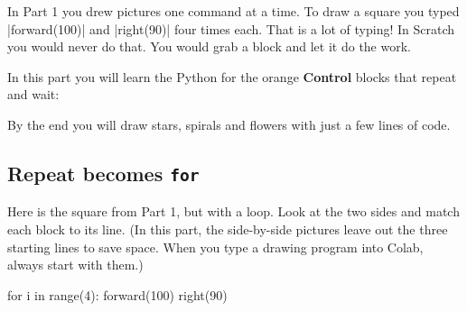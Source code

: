 
In Part 1 you drew pictures one command at a time. To draw a square you typed \py|forward(100)| and \py|right(90)| four times each. That is a lot of typing! In Scratch you would never do that. You would grab a  block and let it do the work.

In this part you will learn the Python for the orange \textbf{Control} blocks that repeat and wait:

\begin{center}
\quad {}\quad {}\quad {}
\end{center}

By the end you will draw stars, spirals and flowers with just a few lines of code.

\subsection*{Repeat becomes \texttt{for}}

Here is the square from Part 1, but with a loop. Look at the two sides and match each block to its line. (In this part, the side-by-side pictures leave out the three starting lines to save space. When you type a drawing program into Colab, always start with them.)

\begin{tcbraster}[raster columns=2, raster equal height=rows, raster column skip=12pt, raster valign=center]
\begin{tcolorbox}[colback=white, colframe=white, boxrule=0pt, valign=center]
\begin{scratch}[scale=0.85]
\end{scratch}
\end{tcolorbox}
\begin{code}
for i in range(4):
    forward(100)
    right(90)
\end{code}
\end{tcbraster}

